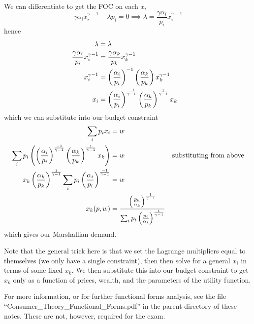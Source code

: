 We can differentiate to get the FOC on each $x_i$
\[
\gamma\alpha_ix_i^{\gamma-1} - \lambda p_i = 0
\implies \lambda = \frac{\gamma \alpha_i}{p_i} x_i^{\gamma-1}
\]
hence
\begin{align}
  \lambda & = \lambda & \notag \\
  \frac{\gamma \alpha_i}{p_i} x_i^{\gamma-1} 
  & = \frac{\gamma \alpha_k}{p_k} x_k^{\gamma-1} & \notag \\
  x_i^{\gamma-1} &= 
  \left(\frac{\alpha_i}{p_i}\right)^{-1}
  \left(\frac{\alpha_k}{p_k}\right)
  x_k^{\gamma-1} & \notag \\
  x_i & = 
  \left(\frac{\alpha_i}{p_i}\right)^{\frac{-1}{\gamma-1}}
  \left(\frac{\alpha_k}{p_k}\right)^{\frac{1}{\gamma-1}}
  x_k & \notag
\end{align}
which we can substitute into our budget constraint
\begin{align}
  \sum_i p_i x_i & = w & \notag \\
  \sum_i p_i \left(   
    \left(\frac{\alpha_i}{p_i}\right)^{\frac{-1}{\gamma-1}}
    \left(\frac{\alpha_k}{p_k}\right)^{\frac{1}{\gamma-1}}
    x_k 
  \right) & = w & \text{substituting from above} \notag \\
  x_k \left(\frac{\alpha_k}{p_k}\right)^{\frac{1}{\gamma-1}}
  \sum_i p_i \left(\frac{\alpha_i}{p_i}\right)^{\frac{-1}{\gamma-1}} & = w & \notag \\
  x_k(p,w) & 
  = \frac{
    \left(\frac{p_k}{\alpha_k}\right)^{\frac{1}{\gamma-1}}
  } {
    \sum_i p_i \left(\frac{p_i}{\alpha_i}\right)^{\frac{1}{\gamma-1}}
  } & \notag
\end{align}
which gives our Marshallian demand.

Note that the general trick here is that we set the Lagrange
multipliers equal to themselves (we only have a single constraint),
then then solve for a general $x_i$ in terms of some fixed $x_k$. We
then substitute this into our budget constraint to get $x_k$ only as a
function of prices, wealth, and the parameters of the utility function.


For more information, or for further functional forms analysis, see
the file ``Consumer\_Theory\_Functional\_Forms.pdf'' in the parent
directory of these notes. These are not, however, required for the
exam.
